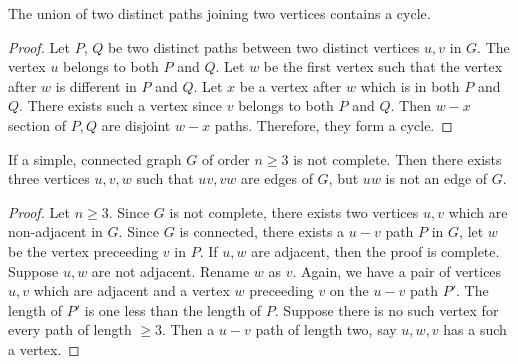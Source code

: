 \begin{exercise}
	The union of two distinct paths joining two vertices contains a cycle.
\end{exercise}
\begin{proof}
	Let $P$, $Q$ be two distinct paths between two distinct vertices $u,v$ in $G$.
	The vertex $u$ belongs to both $P$ and $Q$.
	Let $w$ be the first vertex such that the vertex after $w$ is different in $P$ and $Q$. Let $x$ be a vertex after $w$ which is in both $P$ and $Q$. There exists such a vertex since $v$ belongs to both $P$ and $Q$. Then $w-x$ section of $P,Q$ are disjoint $w-x$ paths. Therefore, they form a cycle.
\end{proof}
\begin{exercise}
	If a simple, connected graph $G$ of order $n \ge 3$ is not complete. Then there exists three vertices $u,v,w$ such that $uv,vw$ are edges of $G$, but $uw$ is not an edge of $G$.
\end{exercise}
\begin{proof}
	Let $n \ge 3$. Since $G$ is not complete, there exists two vertices $u,v$ which are non-adjacent in $G$. Since $G$ is connected, there exists a $u-v$ path $P$ in $G$, let $w$ be the vertex preceeding $v$ in $P$. If $u,w$ are adjacent, then the proof is complete.\\

	Suppose $u,w$ are not adjacent. Rename $w$ as $v$. Again, we have a pair of vertices $u,v$ which are adjacent and a vertex $w$ preceeding $v$ on the $u-v$ path $P'$. The length of $P'$ is one less than the length of $P$. Suppose there is no such vertex for every path of length $\ge 3$. Then a $u-v$ path of length two, say $u,w,v$ has a such a vertex.
\end{proof}

